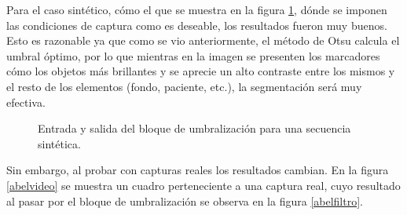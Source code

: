 Para el caso sintético, cómo el que se muestra en la figura \ref{resUmbralizacion}, dónde se imponen las condiciones de captura como es deseable, los resultados fueron muy buenos. Esto es razonable ya que como se vio anteriormente, el método de Otsu\cite{otsu} calcula el umbral óptimo, por lo que mientras en la imagen se presenten los marcadores cómo los objetos más brillantes y se aprecie un alto contraste entre los mismos y el resto de los elementos (fondo, paciente, etc.), la segmentación será muy efectiva.

\begin{figure}[H]
        \centering
        \hspace{3 mm}

  \caption{Entrada y salida del bloque de umbralización para una secuencia sintética.}
      \label{resUmbralizacion}
\end{figure}

Sin embargo, al probar con capturas reales los resultados cambian. En la figura \ref{abelvideo} se muestra un cuadro perteneciente a una captura real, cuyo resultado al pasar por el bloque de umbralización se observa en la figura \ref{abelfiltro}. 

